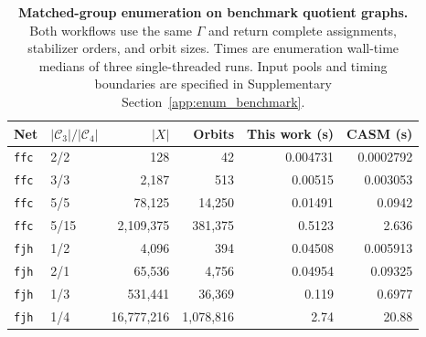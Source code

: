 \documentclass[a5paper, 10pt]{article}
\begin{document}
\begin{table}[H]
\centering\scriptsize
\setlength{\tabcolsep}{1.2mm}
\caption{\textbf{Matched-group enumeration on benchmark quotient graphs.} Both workflows use the same $\Gamma$ and return complete assignments, stabilizer orders, and orbit sizes. Times are enumeration wall-time medians of three single-threaded runs. Input pools and timing boundaries are specified in Supplementary Section~\ref{app:enum_benchmark}.}
\label{tab:casm}
\begin{tabular}{llrrrr}
\toprule
Net & $|\mathcal C_3|/|\mathcal C_4|$ & $|X|$ & Orbits & This work (s) & CASM (s) \\
\midrule
\texttt{ffc} & 2/2 & 128 & 42 & 0.004731 & 0.0002792 \\
\texttt{ffc} & 3/3 & 2,187 & 513 & 0.00515 & 0.003053 \\
\texttt{ffc} & 5/5 & 78,125 & 14,250 & 0.01491 & 0.0942 \\
\texttt{ffc} & 5/15 & 2,109,375 & 381,375 & 0.5123 & 2.636 \\
\texttt{fjh} & 1/2 & 4,096 & 394 & 0.04508 & 0.005913 \\
\texttt{fjh} & 2/1 & 65,536 & 4,756 & 0.04954 & 0.09325 \\
\texttt{fjh} & 1/3 & 531,441 & 36,369 & 0.119 & 0.6977 \\
\texttt{fjh} & 1/4 & 16,777,216 & 1,078,816 & 2.74 & 20.88 \\
\bottomrule
\end{tabular}
\end{table}
\end{document}
